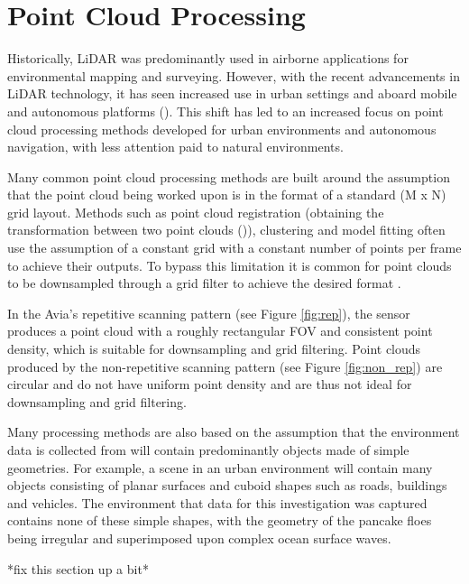 \section{Point Cloud Processing}
\label{sec:ch3:section4}

Historically, \ac{LiDAR} was predominantly used in airborne applications for environmental mapping and surveying. However, with the recent advancements in \ac{LiDAR} technology, it has seen increased use in urban settings and aboard mobile and autonomous platforms (\cite{brazealRigorousObservationModel2021}). This shift has led to an increased focus on point cloud processing methods developed for urban environments and autonomous navigation, with less attention paid to natural environments.

Many common point cloud processing methods are built around the assumption that the point cloud being worked upon is in the format of a standard (M x N) grid layout. Methods such as point cloud registration (obtaining the transformation between two point clouds (\cite{huangComprehensiveSurveyPoint2021})), clustering and model fitting often use the assumption of a constant grid with a constant number of points per frame to achieve their outputs. To bypass this limitation it is common for point clouds to be downsampled through a grid filter to achieve the desired format \cite{3DPointCloud}.

In the Avia's repetitive scanning pattern (see Figure \ref{fig:rep}), the sensor produces a point cloud with a roughly rectangular \ac{FOV} and consistent point density, which is suitable for downsampling and grid filtering. Point clouds produced by the non-repetitive scanning pattern (see Figure \ref{fig:non_rep}) are circular and do not have uniform point density and are thus not ideal for downsampling and grid filtering.

Many processing methods are also based on the assumption that the environment data is collected from will contain predominantly objects made of simple geometries. For example, a scene in an urban environment will contain many objects consisting of planar surfaces and cuboid shapes such as roads, buildings and vehicles. The environment that data for this investigation was captured contains none of these simple shapes, with the geometry of the pancake floes being irregular and superimposed upon complex ocean surface waves.

*fix this section up a bit*

